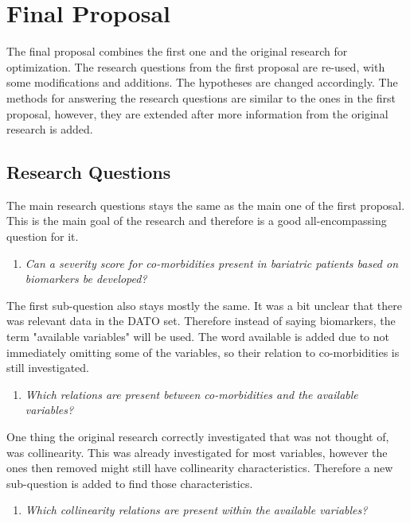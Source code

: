 \documentclass[10pt,a4paper]{article}
\begin{document}
	\section{Final Proposal}
	
	The final proposal combines the first one and the original research for optimization. The research questions from the first proposal are re-used, with some modifications and additions. The hypotheses are changed accordingly. The methods for answering the research questions are similar to the ones in the first proposal, however, they are extended after more information from the original research is added. 
	
	\subsection{Research Questions}
	
	The main research questions stays the same as the main one of the first proposal. This is the main goal of the research and therefore is a good all-encompassing question for it. 
	
	\begin{enumerate}
		\item[] \emph{Can a severity score for co-morbidities present in bariatric patients based on biomarkers be developed?}
	\end{enumerate}
	
	The first sub-question also stays mostly the same. It was a bit unclear that there was relevant data in the DATO set. Therefore instead of saying biomarkers, the term "available variables" will be used. The word available is added due to not immediately omitting some of the variables, so their relation to co-morbidities is still investigated.
	
	\begin{enumerate}
		\item \emph{Which relations are present between co-morbidities and the available variables?}
	\end{enumerate}
	
	One thing the original research correctly investigated that was not thought of, was collinearity. This was already investigated for most variables, however the ones then removed might still have collinearity characteristics. Therefore a new sub-question is added to find those characteristics.
	
	\begin{enumerate}[resume]
		\item \emph{Which collinearity relations are present within the available variables?}
	\end{enumerate}
		
\end{document}
